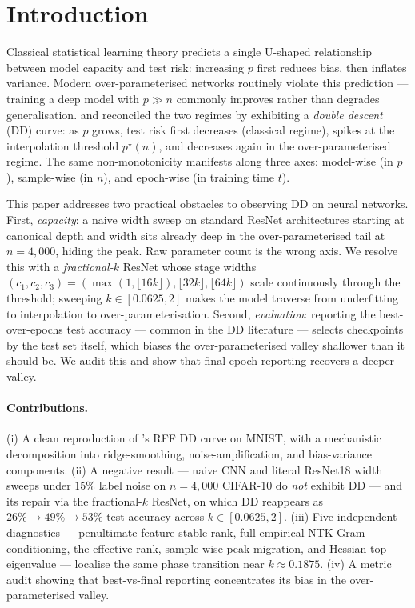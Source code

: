 \section{Introduction}
\label{sec:intro}

Classical statistical learning theory predicts a single U-shaped relationship between model capacity and test risk: increasing $p$ first reduces bias, then inflates variance. Modern over-parameterised networks routinely violate this prediction --- training a deep model with $p \gg n$ commonly improves rather than degrades generalisation. \citet{belkin2019reconciling} and \citet{nakkiran2021deep} reconciled the two regimes by exhibiting a \emph{double descent} (DD) curve: as $p$ grows, test risk first decreases (classical regime), spikes at the interpolation threshold $p^\star(n)$, and decreases again in the over-parameterised regime. The same non-monotonicity manifests along three axes: model-wise (in $p$), sample-wise (in $n$), and epoch-wise (in training time $t$).

This paper addresses two practical obstacles to observing DD on neural networks. First, \emph{capacity}: a naive width sweep on standard ResNet architectures starting at canonical depth and width sits already deep in the over-parameterised tail at $n=4{,}000$, hiding the peak. Raw parameter count is the wrong axis. We resolve this with a \emph{fractional-$k$} ResNet whose stage widths $(c_1,c_2,c_3) = (\max(1,\lfloor 16k\rfloor), \lfloor 32k\rfloor, \lfloor 64k\rfloor)$ scale continuously through the threshold; sweeping $k\in[0.0625,2]$ makes the model traverse from underfitting to interpolation to over-parameterisation. Second, \emph{evaluation}: reporting the best-over-epochs test accuracy --- common in the DD literature --- selects checkpoints by the test set itself, which biases the over-parameterised valley shallower than it should be. We audit this and show that final-epoch reporting recovers a deeper valley.

\paragraph{Contributions.} (i) A clean reproduction of \citet{belkin2019reconciling}'s RFF DD curve on MNIST, with a mechanistic decomposition into ridge-smoothing, noise-amplification, and bias-variance components. (ii) A negative result --- naive CNN and literal ResNet18 width sweeps under $15\%$ label noise on $n=4{,}000$ CIFAR-10 do \emph{not} exhibit DD --- and its repair via the fractional-$k$ ResNet, on which DD reappears as $26\%\!\to\!49\%\!\to\!53\%$ test accuracy across $k\in[0.0625,2]$. (iii) Five independent diagnostics --- penultimate-feature stable rank, full empirical NTK Gram conditioning, the \citet{bartlett2020benign} effective rank, sample-wise peak migration, and Hessian top eigenvalue --- localise the same phase transition near $k\approx0.1875$. (iv) A metric audit showing that best-vs-final reporting concentrates its bias in the over-parameterised valley.

